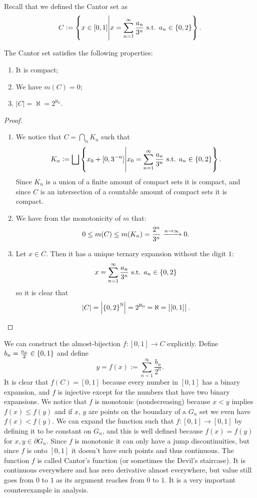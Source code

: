\documentclass[11pt,a4paper]{article}
\begin{document}
\begin{remark}
  Recall that we defined the Cantor set as
  \[
    C := \left\{x \in [0,1] \middle\vert x =
      \sum_{n=1}^{\infty} \frac{a_n}{3^n} \text{ s.t. } a_n \in \left\{0,2\right\}\right\}.
  \]
\end{remark}

\begin{proposition}
  The Cantor set satisfies the following properties:
  \begin{enumerate}
    \item[(1)] It is compact;
    \item[(2)] We have $m(C) = 0$;
    \item[(3)] $|C| = \aleph = 2^{\aleph_0}$.
  \end{enumerate}
\end{proposition}
\begin{proof} \phantom{}
\begin{enumerate}
\item[(1)] We notice that
  $C = \bigcap_{n} K_n$ such that
  \[
    K_n := \bigsqcup
    \left\{x_0 + [0,3^{-n}] \middle\vert x_0 = 
    \sum_{n=1}^{\infty} \frac{a_n}{3^n} \text{ s.t. } a_n \in \left\{0,2\right\}\right\}.
  \]
  Since $K_n$ is a union of a finite amount of compact sets it is compact,
  and since $C$ is an intersection of a countable amount of compact sets
  it is compact.
\item[(2)] We have from the monotonicity of $m$ that:
  \[
    0 \le m(C) \le m(K_n) = \frac{2^n}{3^n} \xrightarrow{n \to \infty} 0.
  \]
\item[(3)] Let $x \in C$. Then it has a unique ternary expansion without
  the digit $1$:
  \[
    x = \sum_{n=1}^{\infty} \frac{a_n}{3^n} \text{ s.t. } a_n \in \left\{0,2\right\}
  \]
  so it is clear that
  \[
    |C| = \left\lvert\left\{0,2\right\}^{\mathbb{N}}\right\rvert = 2^{\aleph_0} = \aleph = \left\lvert[0,1]\right\rvert.
  \]
\end{enumerate}
\end{proof}

\begin{definition}
  We can construct the almost-bijection $f \colon [0,1] \to C$ explicitly.
  Define $b_n = \frac{a_n}{2} \in \left\{0,1\right\}$ and define
  \[
      y = f(x) := \sum_{n=1}^{\infty} \frac{b_n}{2^n}.
  \]
  It is clear that $f(C) = [0,1]$ because every number in $[0,1]$ has a binary
  expansion, and $f$ is injective except for the numbers that have two
  binary expansions.
  We notice that $f$ is monotonic (nondecreasing) because $x < y$
  implies $f(x) \le f(y)$ and if $x$, $y$ are points
  on the boundary of a $G_n$ set we even have $f(x) < f(y)$.
  We can expand the function such that $f \colon [0,1] \to [0,1]$ by
  defining it to be constant on $G_n$, and this is well defined because
  $f(x) = f(y)$ for $x,y \in \partial G_n$.
  Since $f$ is monotonic it can only have a jump discontinuities,
  but since $f$ is onto $[0,1]$ it doesn't have such points and thus continuous.
  The function $f$ is called Cantor's function
  (or sometimes the Devil's staircase).
  It is continuous everywhere and has zero derivative almost everywhere,
  but value still goes from $0$ to $1$ as its argument reaches from $0$ to $1$.
  It is a very important counterexample in analysis.
\end{definition}
\end{document}
